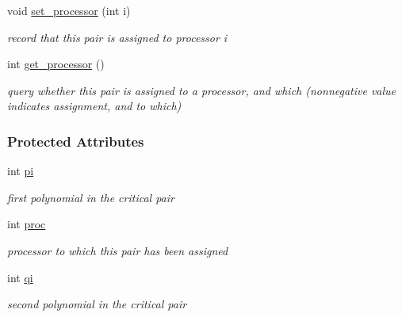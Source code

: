 \begin{Indent}
\begin{DoxyCompactItemize}
void \hyperlink{group___g_b_computation_a4c0085660583e247f354735ee900f2d3}{set\+\_\+processor} (int i)
\begin{DoxyCompactList}\small\item\em record that this pair is assigned to processor {\ttfamily i} \end{DoxyCompactList}\item 
\mbox{\label{group___g_b_computation_a1f07b8a991c138ad6c8de5deeb64ece6}} 
int \hyperlink{group___g_b_computation_a1f07b8a991c138ad6c8de5deeb64ece6}{get\+\_\+processor} ()
\begin{DoxyCompactList}\small\item\em query whether this pair is assigned to a processor, and which (nonnegative value indicates assignment, and to which) \end{DoxyCompactList}\end{DoxyCompactItemize}
\end{Indent}
\subsubsection*{Protected Attributes}
\begin{DoxyCompactItemize}
\item 
\mbox{\label{group___g_b_computation_a815645cd7956540b6980868654e149a3}} 
int \hyperlink{group___g_b_computation_a815645cd7956540b6980868654e149a3}{pi}
\begin{DoxyCompactList}\small\item\em first polynomial in the critical pair \end{DoxyCompactList}\item 
\mbox{\label{group___g_b_computation_a4e0a3c515ad3d9e29cec832d95ab2caa}} 
int \hyperlink{group___g_b_computation_a4e0a3c515ad3d9e29cec832d95ab2caa}{proc}
\begin{DoxyCompactList}\small\item\em processor to which this pair has been assigned \end{DoxyCompactList}\item 
\mbox{\label{group___g_b_computation_a14a644d6decf4147a78dbaa85612130a}} 
int \hyperlink{group___g_b_computation_a14a644d6decf4147a78dbaa85612130a}{qi}
\begin{DoxyCompactList}\small\item\em second polynomial in the critical pair \end{DoxyCompactList}\end{DoxyCompactItemize}
\label{class_dynamic___engine_1_1_p_p___with___ideal}

